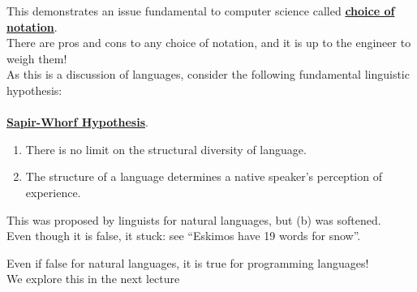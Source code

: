 \documentclass[../../lecture_notes.tex]{subfiles}
\begin{document}
\noindent This demonstrates an issue fundamental to computer science called \textbf{\underline{choice of notation}}.\\
There are pros and cons to any choice of notation, and it is up to the engineer to weigh them!\\
As this is a discussion of languages, consider the following fundamental linguistic hypothesis:\\
\\ \textbf{\underline{Sapir-Whorf Hypothesis}}. \begin{enumerate}[label=\alph*)]
\item There is no limit on the structural diversity of language.
\item The structure of a language determines a native speaker's perception of experience.\\
\end{enumerate}
This was proposed by linguists for natural languages, but (b) was softened.\\
Even though it is false, it stuck: see “Eskimos have 19 words for snow”.

Even if false for natural languages,  it is true for programming languages!\\
We explore this in the next lecture
\end{document}
